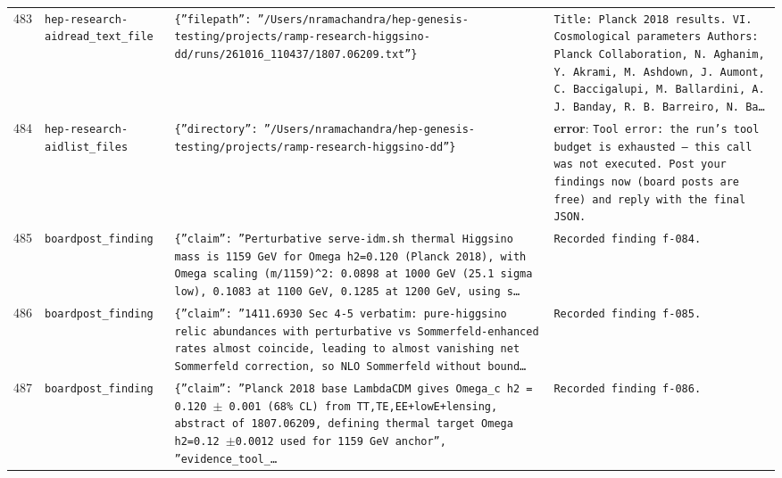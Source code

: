 \documentclass[11pt,a4paper]{article}
\begin{document}
\begin{longtable}{@{}p{}p{}p{}p{}@{}}
483 & \texttt{hep-research-aid}\newline\texttt{read\_\allowbreak{}text\_\allowbreak{}file} & \texttt{\{''filepath'':\allowbreak{} ''/\allowbreak{}Users/\allowbreak{}nramachandra/\allowbreak{}hep-genesis-testing/\allowbreak{}projects/\allowbreak{}ramp-research-higgsino-dd/\allowbreak{}runs/\allowbreak{}261016\_\allowbreak{}110437/\allowbreak{}1807.06209.txt''\}\allowbreak{}} & \texttt{Title:\allowbreak{} Planck 2018 results. VI. Cosmological parameters Authors:\allowbreak{}  Planck Collaboration,\allowbreak{} N. Aghanim,\allowbreak{} Y. Akrami,\allowbreak{} M. Ashdown,\allowbreak{} J. Aumont,\allowbreak{} C. Baccigalupi,\allowbreak{} M. Ballardini,\allowbreak{} A. J. Banday,\allowbreak{} R. B. Barreiro,\allowbreak{} N. Ba\ldots{}\allowbreak{}} \\
484 & \texttt{hep-research-aid}\newline\texttt{list\_\allowbreak{}files} & \texttt{\{''directory'':\allowbreak{} ''/\allowbreak{}Users/\allowbreak{}nramachandra/\allowbreak{}hep-genesis-testing/\allowbreak{}projects/\allowbreak{}ramp-research-higgsino-dd''\}\allowbreak{}} & \textbf{error}: \texttt{Tool error:\allowbreak{} the run's tool budget is exhausted --- this call was not executed. Post your findings now (board posts are free)\allowbreak{} and reply with the final JSON.} \\
485 & \texttt{board}\newline\texttt{post\_\allowbreak{}finding} & \texttt{\{''claim'':\allowbreak{} ''Perturbative serve-idm.sh thermal Higgsino mass is 1159 GeV for Omega h2=\allowbreak{}0.120 (Planck 2018)\allowbreak{},\allowbreak{} with Omega scaling (m/\allowbreak{}1159)\allowbreak{}\textasciicircum{}\allowbreak{}2:\allowbreak{} 0.0898 at 1000 GeV (25.1 sigma low)\allowbreak{},\allowbreak{} 0.1083 at 1100 GeV,\allowbreak{} 0.1285 at 1200 GeV,\allowbreak{} using s\ldots{}\allowbreak{}} & \texttt{Recorded finding f-084.} \\
486 & \texttt{board}\newline\texttt{post\_\allowbreak{}finding} & \texttt{\{''claim'':\allowbreak{} ''1411.6930 Sec 4-5 verbatim:\allowbreak{} pure-higgsino relic abundances with perturbative vs Sommerfeld-enhanced rates almost coincide,\allowbreak{} leading to almost vanishing net Sommerfeld correction,\allowbreak{} so NLO Sommerfeld without bound\ldots{}\allowbreak{}} & \texttt{Recorded finding f-085.} \\
487 & \texttt{board}\newline\texttt{post\_\allowbreak{}finding} & \texttt{\{''claim'':\allowbreak{} ''Planck 2018 base LambdaCDM gives Omega\_\allowbreak{}c h2 =\allowbreak{} 0.120 $\pm$ 0.001 (68\% CL)\allowbreak{} from TT,\allowbreak{}TE,\allowbreak{}EE+lowE+lensing,\allowbreak{} abstract of 1807.06209,\allowbreak{} defining thermal target Omega h2=\allowbreak{}0.12 $\pm$0.0012 used for 1159 GeV anchor'',\allowbreak{} ''evidence\_\allowbreak{}tool\_\allowbreak{}\ldots{}\allowbreak{}} & \texttt{Recorded finding f-086.} \\

\end{longtable}
\end{document}
